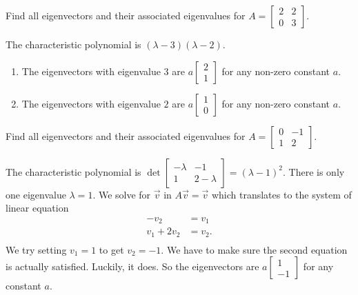 \documentclass[../main.tex]{subfiles}
\begin{document}
\begin{exercise}
  Find all eigenvectors and their associated eigenvalues for \(A = \begin{bmatrix} 2 & 2 \\ 0 & 3 \end{bmatrix}\).

\begin{solution}
    The characteristic polynomial is \((\lambda-3)(\lambda-2)\).  
    \begin{enumerate}
      \item The eigenvectors with eigenvalue \(3\) are \(a\begin{bmatrix} 2 \\ 1\end{bmatrix}\) for any non-zero constant \(a\).
      \item The eigenvectors with eigenvalue \(2\) are \(a\begin{bmatrix} 1 \\ 0\end{bmatrix}\) for any non-zero constant \(a\).
    \end{enumerate}
  \end{solution}
\end{exercise}

\begin{exercise}
  Find all eigenvectors and their associated eigenvalues for \(A = \begin{bmatrix} 0 & -1 \\ 1 & 2 \end{bmatrix}\).

  \begin{solution}
    The characteristic polynomial is \(\det \begin{bmatrix} -\lambda & -1 \\ 1 & 2 - \lambda \end{bmatrix} = (\lambda-1)^{2}\). There is only one eigenvalue \(\lambda = 1\). We solve for \(\vec{v}\) in \(A\vec{v} = \vec{v}\) which translates to the system of linear equation
    \begin{align*}
      -v_{2} &= v_{1} \\
      v_{1}+2v_{2} &= v_{2}. \\
    \end{align*}
    We try setting \(v_{1} = 1\) to get \(v_{2} = -1\). We have to make sure the second equation is actually satisfied. Luckily, it does. So the eigenvectors are
    \(
      a
      \begin{bmatrix}
        1 \\ -1
      \end{bmatrix}
    \) for any constant \(a\).
  \end{solution}
\end{exercise}
\end{document}
